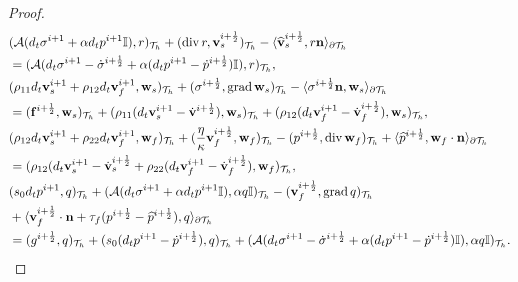 \documentclass[10pt,letterpaper]{amsart}
\theoremstyle{plain} %
\theoremstyle{remark} %
\newcommand{\vect}[1]{\mathbf{#1}}
\newcommand{\divergence}{\mathrm{div}\,}
\newcommand{\grad}{\mathrm{grad}\,}
\newcommand{\Id}{\mathbb{I}} %
\newcommand{\Ael}{\mathcal{A}} %
\newcommand{\Thprod}[2]{( #1, #2 )_{\mathcal{T}_h}}
\newcommand{\pThprod}[2]{\langle #1, #2 \rangle_{\partial \mathcal{T}_{h}}}
\begin{document}
\begin{proof}
%
	\begin{align*}
		&\Thprod{\Ael(d_t \sigma^{i+1} + \alpha d_t{p}^{i+1} \Id)}{r} +\Thprod{\divergence r}{\vect{v}_{s}^{i+\frac 12}} -\pThprod{\widehat{\vect{v}}_{s}^{i+\frac 12}}{r \vect{n}} 
		\\
		\notag
		& = \Thprod{\Ael(d_t \sigma^{i+1} - \dot{\sigma}^{i+\frac 12} + \alpha (d_t{p}^{i+1} - \dot{p}^{i+\frac 12})\Id)}{r} ,
		\\ 
		&\Thprod{\rho_{11}d_t{\vect{v}}_{s}^{i+1}+\rho_{12}d_t{\vect{v}}_{f}^{i+1}}{\vect{w}_{s}} + \Thprod{\sigma^{i+\frac 12}}{\grad \vect{w}_{s}} - \pThprod{\sigma^{i+\frac 12} \vect{n} }{\vect{w}_{s}}
		\\
		& = \Thprod{\vect{f}^{i+\frac 12}}{\vect{w}_{s}} + \Thprod{\rho_{11}(d_t{\vect{v}}_{s}^{i+1}-\dot{\vect{v}}^{i+\frac 12})}{\vect{w}_{s}} + \Thprod{\rho_{12}(d_t{\vect{v}}_{f}^{i+1}-\dot{\vect{v}}_f^{i+\frac 12}) }{\vect{w}_{s}}, 
		\\
		&\Thprod{\rho_{12}d_t{\vect{v}}_{s}^{i+1}+\rho_{22}d_t{\vect{v}}_{f}^{i+1}}{\vect{w}_{f}} + \Thprod{\frac{\eta}{\kappa} \vect{v}_{f}^{i+\frac 12}}{\vect{w}_{f}} 
		- \Thprod{p^{i+\frac 12} }{\divergence\vect{w}_{f}} +\pThprod{\widehat{p}^{i+\frac 12}}{\vect{w}_{f}\cdot\vect{n}} 
		\\
		&= \Thprod{\rho_{12}(d_t{\vect{v}}_{s}^{i+1} - \dot{\vect{v}}_{s}^{i+\frac 12}+\rho_{22}(d_t{\vect{v}}_{f}^{i+1} - \dot{\vect{v}}_{f}^{i+\frac 12})}{\vect{w}_{f}} , 
		\\
		&\Thprod{s_{0}d_t{p}^{i+1}}{q} + \Thprod{\Ael(d_t{\sigma}^{i+1}+\alpha d_t{p}^{i+1}\Id)}{\alpha q\Id} - \Thprod{\vect{v}_{f}^{i+\frac 12}}{\grad q} 
		\\
		&+ \pThprod{\vect{v}_{f}^{i+\frac 12}\cdot \vect{n} + \tau_{f} (p^{i+\frac 12} - \widehat{p}^{i+\frac 12})}{q} 
		\\
		&= \Thprod{ g^{i+\frac 12}}{q} 
		+ \Thprod{s_{0}(d_t{p}^{i+1}-\dot{p}^{i+\frac 12})}{q} + \Thprod{\Ael(d_t{\sigma}^{i+1}- \dot{\sigma}^{i+\frac 12}+\alpha (d_t{p}^{i+1} - \dot{p}^{i+\frac 12})\Id)}{\alpha q\Id} .

\end{align*}
\end{proof}
\end{document}
